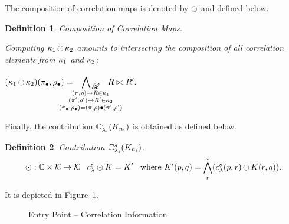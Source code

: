 \documentclass[11pt]{article}
\newtheorem{definition}{Definition}
\begin{document}
The composition of correlation maps is denoted by $\acompose$ and defined below. 
\begin{definition}{Composition of Correlation Maps.}\label{ch7:composecormaps:definition}

Computing $\corv_1 \acompose \corv_2$ amounts to intersecting the composition of
all correlation elements from $\corv_1$ and $\corv_2$:\\

\centerline{$
(\corv_1 \acompose \corv_2)(\pi_{\bullet}, \rho_{\bullet}) =
\displaystyle\mathop{\bigwedge\raisebox{-3pt}
{$\displaystyle\mathlarger{\mathlarger{{}_{\mathscr{R}}}}$}}_{\hspace{1.9em}\mathclap{\substack{(\pi, \rho) \mapsto \rel \in \corv_1\\ (\pi', \rho') \mapsto \rel' \in \corv_2 \\ (\pi_{\bullet}, \rho_{\bullet}) =  (\pi, \rho) \bullet (\pi', \rho')}}\hspace{1.9em}}^{} \rel  \bowtie \rel'.
 $}
\end{definition}

Finally, the contribution $\Ctransfer {\intracor_{n_i}}{s}{\lambda_i}$ is 
obtained as defined below. 

\begin{definition}{Contribution $\Ctransfer {\intracor_{n_i}}{s}{\lambda_i}$.}\label{ch7:computecontrib:definition}
\[ \compose : \mathbb{C} \times \mathcal{K} \to \mathcal{K}\;\;\;
 \dls \compose \intracor = \intracor' \;\;\;
 \textrm{where } 
 \displaystyle \intracor'(p,q) = \hat{\bigwedge_{r}} (\dls(p, r) \acompose \intracor(r, q)).\]
\end{definition}
\noindent It is depicted in Figure~\ref{intra:cor:contrib}.

\begin{figure}[hbt]\centering
{}
\caption{Entry Point -- Correlation Information}
\label{intra:cor:contrib}
\end{figure}
\end{document}
